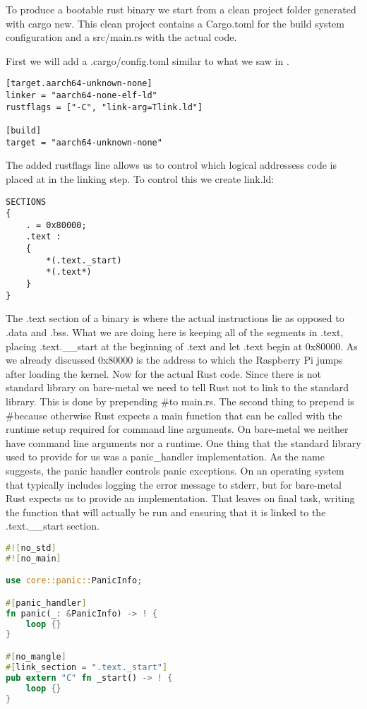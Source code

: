 To produce a bootable rust binary we start from a clean project folder generated with cargo new.
This clean project contains a Cargo.toml for the build system configuration and a src/main.rs with the actual code.

First we will add a .cargo/config.toml similar to what we saw in .
\begin{verbatim}
[target.aarch64-unknown-none]
linker = "aarch64-none-elf-ld"
rustflags = ["-C", "link-arg=Tlink.ld"]
    
[build]
target = "aarch64-unknown-none"
\end{verbatim}
The added rustflags line allows us to control which logical addressess code is placed at in the linking step.
To control this we create link.ld:
\begin{verbatim}
SECTIONS
{
    . = 0x80000;
    .text :
    {
        *(.text._start)
        *(.text*)
    }
}
\end{verbatim}
The .text section of a binary is where the actual instructions lie as opposed to .data and .bss.
What we are doing here is keeping all of the segments in .text, placing .text.\_\_start at the beginning of .text and let .text begin at 0x80000.
As we already discussed 0x80000 is the address to which the Raspberry Pi jumps after loading the kernel.
Now for the actual Rust code. Since there is not standard library on bare-metal we need to tell Rust not to link to the standard library.
This is done by prepending \#\![no\_std] to main.rs.
The second thing to prepend is \#\![no\_main] because otherwise Rust expects a main function that can be called with the runtime setup required for command line arguments.
On bare-metal we neither have command line arguments nor a runtime.
One thing that the standard library used to provide for us was a panic\_handler implementation.
As the name suggests, the panic handler controls panic exceptions.
On an operating system that typically includes logging the error message to stderr, but for bare-metal Rust expects us to provide an implementation.
That leaves on final task, writing the function that will actually be run and ensuring that it is linked to the .text.\_\_start section.
\begin{lstlisting}[language=Rust,style=colouredRust]
#![no_std]
#![no_main]

use core::panic::PanicInfo;

#[panic_handler]
fn panic(_: &PanicInfo) -> ! {
    loop {}
}

#[no_mangle]
#[link_section = ".text._start"]
pub extern "C" fn _start() -> ! {
	loop {}
}
\end{lstlisting}

